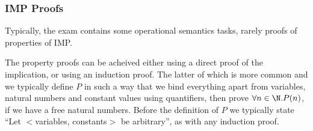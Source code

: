 \subsubsection{IMP Proofs}
\begin{examdetails}
    Typically, the exam contains some operational semantics tasks,
    rarely proofs of properties of IMP.
\end{examdetails}
The property proofs can be acheived either using a direct proof of the implication, or using an induction proof.
The latter of which is more common and we typically define $P$ in such a way that we bind everything apart from variables, natural numbers and constant values
using quantifiers, then prove $\forall n \in \N . P(n)$, if we have a free natural numbers.
Before the definition of $P$ we typically state ``Let $<$variables, constants$>$ be arbitrary'', as with any induction proof.
